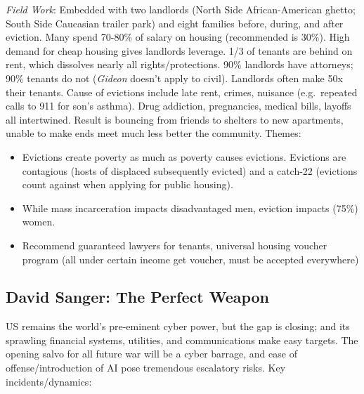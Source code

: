 \documentclass[
]{article}
\begin{document}
\emph{Field Work}: Embedded with two landlords (North Side
African-American ghetto; South Side Caucasian trailer park) and eight
families before, during, and after eviction. Many spend 70-80\% of
salary on housing (recommended is 30\%). High demand for cheap housing
gives landlords leverage. 1/3 of tenants are behind on rent, which
dissolves nearly all rights/protections. 90\% landlords have attorneys;
90\% tenants do not (\emph{Gideon} doesn't apply to civil). Landlords
often make 50x their tenants. Cause of evictions include late rent,
crimes, nuisance (e.g.~repeated calls to 911 for son's asthma). Drug
addiction, pregnancies, medical bills, layoffs all intertwined. Result
is bouncing from friends to shelters to new apartments, unable to make
ends meet much less better the community. Themes:

\begin{itemize}
\item
  Evictions create poverty as much as poverty causes evictions.
  Evictions are contagious (hosts of displaced subsequently evicted) and
  a catch-22 (evictions count against when applying for public housing).
\item
  While mass incarceration impacts disadvantaged men, eviction impacts
  (75\%) women.
\item
  Recommend guaranteed lawyers for tenants, universal housing voucher
  program (all under certain income get voucher, must be accepted
  everywhere)
\end{itemize}

\hypertarget{david-sanger-the-perfect-weapon}{%
\subsection{David Sanger: The Perfect
Weapon}\label{david-sanger-the-perfect-weapon}}

US remains the world's pre-eminent cyber power, but the gap is closing;
and its sprawling financial systems, utilities, and communications make
easy targets. The opening salvo for all future war will be a cyber
barrage, and ease of offense/introduction of AI pose tremendous
escalatory risks. Key incidents/dynamics:
\end{document}
